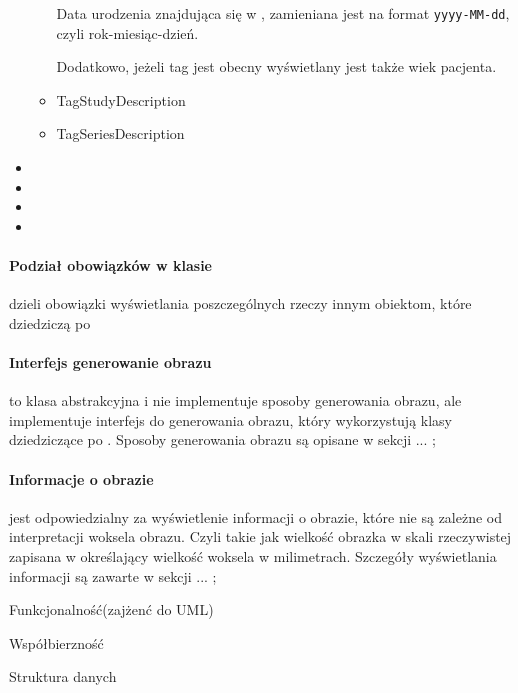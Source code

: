 \begin{itemize}
\begin{itemize}
        Data urodzenia znajdująca się w , zamieniana jest na format \texttt{yyyy-MM-dd}, czyli rok-miesiąc-dzień.

        Dodatkowo, jeżeli tag jest  obecny wyświetlany jest także wiek pacjenta.

        \item TagStudyDescription
        \item TagSeriesDescription
    \end{itemize}

    \item {}
    \item {}
    \item {}
    \item {}
\end{itemize}

\paragraph{Podział obowiązków w klasie}
 dzieli obowiązki wyświetlania poszczególnych rzeczy innym obiektom, które dziedziczą po \sokarclass

\paragraph{Interfejs generowanie obrazu}
 to klasa abstrakcyjna i nie implementuje sposoby generowania obrazu, ale implementuje interfejs do generowania obrazu, który wykorzystują klasy dziedziczące po .
Sposoby generowania obrazu są opisane w sekcji ... ;

\paragraph{Informacje o obrazie}
 jest odpowiedzialny za wyświetlenie informacji o obrazie, które nie są zależne od interpretacji woksela obrazu.
Czyli takie jak wielkość obrazka w skali rzeczywistej zapisana w  określający wielkość woksela w milimetrach.
Szczegóły wyświetlania informacji są zawarte w sekcji ... ;

Funkcjonalność(zajżenć do UML)

Współbierzność

Struktura danych

